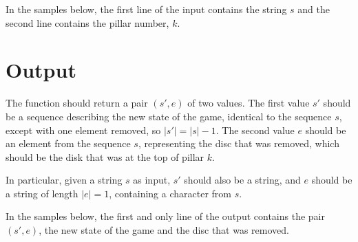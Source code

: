 In the samples below,
the first line of the input contains the string $s$
and the second line contains the pillar number, $k$.

\section*{Output}

The function should return a pair $(s', e)$ of two values.
The first value $s'$ should be a sequence
describing the new state of the game,
identical to the sequence $s$, except with one element removed,
so $|s'| = |s| - 1$.
The second value $e$ should be an element from the sequence $s$,
representing the disc that was removed,
which should be the disk that was at the top of pillar $k$.

In particular, given a string $s$ as input, $s'$ should also be a string,
and $e$ should be a string of length $|e| = 1$, containing a character from $s$.

In the samples below,
the first and only line of the output contains the pair $(s', e)$,
the new state of the game and the disc that was removed.
